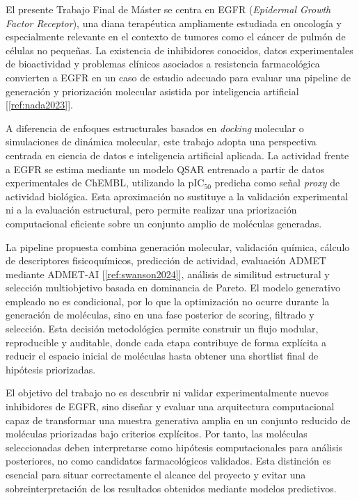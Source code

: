 \documentclass[IB]{TFUOC}%
\begin{document}
El presente Trabajo Final de Máster se centra en EGFR (\textit{Epidermal Growth Factor Receptor}), una diana terapéutica ampliamente estudiada en oncología y especialmente relevante en el contexto de tumores como el cáncer de pulmón de células no pequeñas. La existencia de inhibidores conocidos, datos experimentales de bioactividad y problemas clínicos asociados a resistencia farmacológica convierten a EGFR en un caso de estudio adecuado para evaluar una pipeline de generación y priorización molecular asistida por inteligencia artificial [\ref{ref:nada2023}].

A diferencia de enfoques estructurales basados en \textit{docking} molecular o simulaciones de dinámica molecular, este trabajo adopta una perspectiva centrada en ciencia de datos e inteligencia artificial aplicada. La actividad frente a EGFR se estima mediante un modelo QSAR entrenado a partir de datos experimentales de ChEMBL, utilizando la pIC$_{50}$ predicha como señal \textit{proxy} de actividad biológica. Esta aproximación no sustituye a la validación experimental ni a la evaluación estructural, pero permite realizar una priorización computacional eficiente sobre un conjunto amplio de moléculas generadas.

La pipeline propuesta combina generación molecular, validación química, cálculo de descriptores fisicoquímicos, predicción de actividad, evaluación ADMET mediante ADMET-AI [\ref{ref:swanson2024}], análisis de similitud estructural y selección multiobjetivo basada en dominancia de Pareto. El modelo generativo empleado no es condicional, por lo que la optimización no ocurre durante la generación de moléculas, sino en una fase posterior de scoring, filtrado y selección. Esta decisión metodológica permite construir un flujo modular, reproducible y auditable, donde cada etapa contribuye de forma explícita a reducir el espacio inicial de moléculas hasta obtener una shortlist final de hipótesis priorizadas.

El objetivo del trabajo no es descubrir ni validar experimentalmente nuevos inhibidores de EGFR, sino diseñar y evaluar una arquitectura computacional capaz de transformar una muestra generativa amplia en un conjunto reducido de moléculas priorizadas bajo criterios explícitos. Por tanto, las moléculas seleccionadas deben interpretarse como hipótesis computacionales para análisis posteriores, no como candidatos farmacológicos validados. Esta distinción es esencial para situar correctamente el alcance del proyecto y evitar una sobreinterpretación de los resultados obtenidos mediante modelos predictivos.
\end{document}
